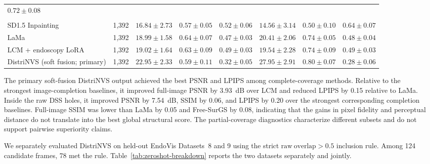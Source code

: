 \documentclass[letterpaper,10pt,conference]{ieeeconf}
\begin{document}
\begin{table}[t]
\begin{tabular}{lccccccc}
$0.72\pm0.08$ \\
\addlinespace
\multicolumn{8}{l}{\textit{Image completion}} \\
SD1.5 Inpainting & 1,392 & $16.84\pm2.73$ & $0.57\pm0.05$ & $0.52\pm0.06$ &
$14.56\pm3.14$ & $0.50\pm0.10$ & $0.64\pm0.07$ \\
LaMa & 1,392 & $18.99\pm1.58$ & $0.64\pm0.07$ & $0.47\pm0.03$ &
$20.41\pm2.06$ & $0.74\pm0.05$ & $0.48\pm0.04$ \\
LCM + endoscopy LoRA & 1,392 & $19.02\pm1.64$ & $0.63\pm0.09$ & $0.49\pm0.03$ &
$19.54\pm2.28$ & $0.74\pm0.09$ & $0.49\pm0.03$ \\
\midrule
DistriNVS (soft fusion; primary) & 1,392 & $\mathbf{22.95\pm2.33}$ & $0.59\pm0.11$ &
$\mathbf{0.32\pm0.05}$ & $\mathbf{27.95\pm2.91}$ & $\mathbf{0.80\pm0.07}$ &
$\mathbf{0.28\pm0.06}$ \\
\bottomrule
\end{tabular}
\end{table}

The primary soft-fusion DistriNVS output achieved the best PSNR and LPIPS
among complete-coverage methods. Relative to the strongest image-completion
baselines, it improved full-image PSNR by 3.93~dB over LCM and reduced LPIPS
by 0.15 relative to LaMa. Inside the raw DSS holes, it improved PSNR by
7.54~dB, SSIM by 0.06, and LPIPS by 0.20 over the strongest corresponding
completion baselines. Full-image SSIM was lower than LaMa by 0.05 and
Free-SurGS by 0.08, indicating that the gains in pixel fidelity and perceptual
distance do not translate into the best global structural score. The
partial-coverage diagnostics characterize different subsets and do not
support pairwise superiority claims.

We separately evaluated DistriNVS on held-out EndoVis Datasets~8 and 9 using
the strict $\mathrm{raw\ overlap}>0.5$ inclusion rule. Among 124 candidate
frames, 78 met the rule. Table~\ref{tab:zeroshot-breakdown} reports the two
datasets separately and jointly.
\end{document}

